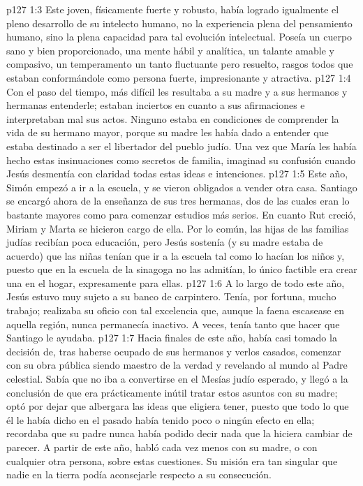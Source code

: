 \vs p127 1:3 Este joven, físicamente fuerte y robusto, había logrado igualmente el pleno desarrollo de su intelecto humano, no la experiencia plena del pensamiento humano, sino la plena capacidad para tal evolución intelectual. Poseía un cuerpo sano y bien proporcionado, una mente hábil y analítica, un talante amable y compasivo, un temperamento un tanto fluctuante pero resuelto, rasgos todos que estaban conformándole como persona fuerte, impresionante y atractiva.
\vs p127 1:4 \pc Con el paso del tiempo, más difícil les resultaba a su madre y a sus hermanos y hermanas entenderle; estaban inciertos en cuanto a sus afirmaciones e interpretaban mal sus actos. Ninguno estaba en condiciones de comprender la vida de su hermano mayor, porque su madre les había dado a entender que estaba destinado a ser el libertador del pueblo judío. Una vez que María les había hecho estas insinuaciones como secretos de familia, imaginad su confusión cuando Jesús desmentía con claridad todas estas ideas e intenciones.
\vs p127 1:5 \pc Este año, Simón empezó a ir a la escuela, y se vieron obligados a vender otra casa. Santiago se encargó ahora de la enseñanza de sus tres hermanas, dos de las cuales eran lo bastante mayores como para comenzar estudios más serios. En cuanto Rut creció, Miriam y Marta se hicieron cargo de ella. Por lo común, las hijas de las familias judías recibían poca educación, pero Jesús sostenía (y su madre estaba de acuerdo) que las niñas tenían que ir a la escuela tal como lo hacían los niños y, puesto que en la escuela de la sinagoga no las admitían, lo único factible era crear una en el hogar, expresamente para ellas.
\vs p127 1:6 A lo largo de todo este año, Jesús estuvo muy sujeto a su banco de carpintero. Tenía, por fortuna, mucho trabajo; realizaba su oficio con tal excelencia que, aunque la faena escasease en aquella región, nunca permanecía inactivo. A veces, tenía tanto que hacer que Santiago le ayudaba.
\vs p127 1:7 Hacia finales de este año, había casi tomado la decisión de, tras haberse ocupado de sus hermanos y verlos casados, comenzar con su obra pública siendo maestro de la verdad y revelando al mundo al Padre celestial. Sabía que no iba a convertirse en el Mesías judío esperado, y llegó a la conclusión de que era prácticamente inútil tratar estos asuntos con su madre; optó por dejar que albergara las ideas que eligiera tener, puesto que todo lo que él le había dicho en el pasado había tenido poco o ningún efecto en ella; recordaba que su padre nunca había podido decir nada que la hiciera cambiar de parecer. A partir de este año, habló cada vez menos con su madre, o con cualquier otra persona, sobre estas cuestiones. Su misión era tan singular que nadie en la tierra podía aconsejarle respecto a su consecución.
